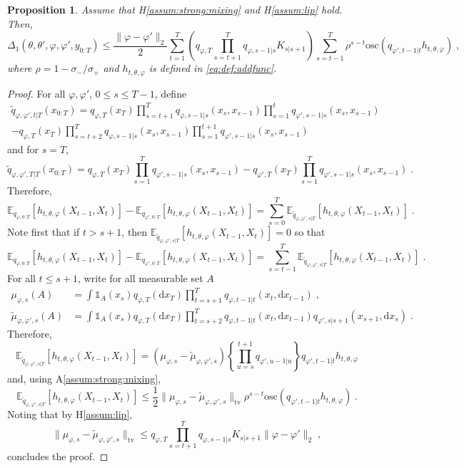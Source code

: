 \documentclass{article}
\newtheorem{proposition}[theorem]{Proposition}
\newcommand{\udlow}{\sigma_-}
\newcommand{\udup}{\sigma_+}
\newcommand{\1}{\mathbbm{1}}
\newcommand{\rmd}{\ensuremath{\mathrm{d}}}
\newcommand{\eqsp}{\;}
\begin{document}
\begin{proposition}
Assume that H\ref{assum:strong:mixing} and H\ref{assum:lip} hold. Then,
$$
\Delta_1(\theta, \theta', \varphi, \varphi', y_{0:T}) \leq \frac{\|\varphi-\varphi'\|_2}{2}\sum_{t=1}^T\left(q_{\varphi,T}\prod_{s=t+1}^Tq_{\varphi,s-1|s}K_{s|s+1}\right)\sum_{s=t-1}^T \rho^{s-t}\mathrm{osc}\left(q_{\varphi',t-1|t}h_{t,\theta,\varphi}\right) \eqsp,
$$
where $\rho = 1-\udlow/\udup$ and $h_{t,\theta,\varphi}$ is defined in \eqref{eq:def:addfunc}.
\end{proposition}
\begin{proof}
For all $\varphi,\varphi'$, $0\leq s \leq T-1$, define
\begin{multline*}
\tilde q_{\varphi,\varphi',t|T}(x_{0:T}) = q_{\varphi,T}(x_T)\prod_{s=t+1}^Tq_{\varphi,s-1|s}(x_s,x_{s-1})\prod_{s=1}^tq_{\varphi',s-1|s}(x_s,x_{s-1}) \\
- q_{\varphi,T}(x_T)\prod_{s=t+2}^Tq_{\varphi,s-1|s}(x_s,x_{s-1})\prod_{s=1}^{t+1}q_{\varphi',s-1|s}(x_s,x_{s-1})
\end{multline*}
and for $s=T$,
$$
\tilde q_{\varphi,\varphi',T|T}(x_{0:T}) = q_{\varphi,T}(x_T)\prod_{s=1}^Tq_{\varphi',s-1|s}(x_s,x_{s-1}) 
- q_{\varphi',T}(x_T)\prod_{s=1}^Tq_{\varphi',s-1|s}(x_s,x_{s-1})\eqsp.
$$
Therefore,
$$
\mathbb{E}_{q_{\varphi,0:T}}\left[h_{t,\theta,\varphi}(X_{t-1},X_t)\right] - \mathbb{E}_{q_{\varphi',0:T}}\left[h_{t,\theta,\varphi}(X_{t-1},X_t)\right] = \sum_{s=0}^T \mathbb{E}_{\tilde q_{\varphi,\varphi',s|T}}\left[h_{t,\theta,\varphi}(X_{t-1},X_t)\right] \eqsp.
$$
Note first that if $t> s+1$, then $\mathbb{E}_{\tilde q_{\varphi,\varphi',s|T}}\left[h_{t,\theta,\varphi}(X_{t-1},X_t)\right] = 0$ so that
$$
\mathbb{E}_{q_{\varphi,0:T}}\left[h_{t,\theta,\varphi}(X_{t-1},X_t)\right] - \mathbb{E}_{q_{\varphi',0:T}}\left[h_{t,\theta,\varphi}(X_{t-1},X_t)\right] = \sum_{s=t-1}^T \mathbb{E}_{\tilde q_{\varphi,\varphi',s|T}}\left[h_{t,\theta,\varphi}(X_{t-1},X_t)\right] \eqsp.
$$
For all $t\leq s+1$, write for all measurable set $A$
\begin{align*}
\mu_{\varphi,s}(A) &= \int \mathds{1}_A(x_s) q_{\varphi,T}(\rmd x_T)\prod_{t=s+1}^Tq_{\varphi,t-1|t}(x_t,\rmd x_{t-1})\eqsp,\\
\tilde\mu_{\varphi,\varphi',s}(A) &= \int \mathds{1}_A(x_s) q_{\varphi,T}(\rmd x_T)\prod_{t=s+2}^Tq_{\varphi,t-1|t}(x_t,\rmd x_{t-1})q_{\varphi',s|s+1}(x_{s+1},\rmd x_{s})\eqsp.
\end{align*}
Therefore,
$$
\mathbb{E}_{\tilde q_{\varphi,\varphi',s|T}}\left[h_{t,\theta,\varphi}(X_{t-1},X_t)\right] = \left(\mu_{\varphi,s} - \tilde\mu_{\varphi,\varphi',s}\right)\left\{\prod_{u=s}^{t+1}q_{\varphi',u-1|u}\right\}q_{\varphi',t-1|t}h_{t,\theta,\varphi}
$$
and, using A\ref{assum:strong:mixing},
$$
\mathbb{E}_{\tilde q_{\varphi,\varphi',s|T}}\left[h_{t,\theta,\varphi}(X_{t-1},X_t)\right]  \leq \frac{1}{2}\|\mu_{\varphi,s}-\tilde\mu_{\varphi,\varphi',s}\|_{\mathrm{tv}}\rho^{s-t}\mathrm{osc}\left(q_{\varphi',t-1|t}h_{t,\theta,\varphi}\right)\eqsp.
$$
Noting that by H\ref{assum:lip},
$$
\|\mu_{\varphi,s}-\tilde\mu_{\varphi,\varphi',s}\|_{\mathrm{tv}} \leq q_{\varphi,T}\prod_{s=t+1}^Tq_{\varphi,s-1|s}K_{s|s+1}\|\varphi-\varphi'\|_2\eqsp,
$$
concludes the proof.
\end{proof}
\end{document}
